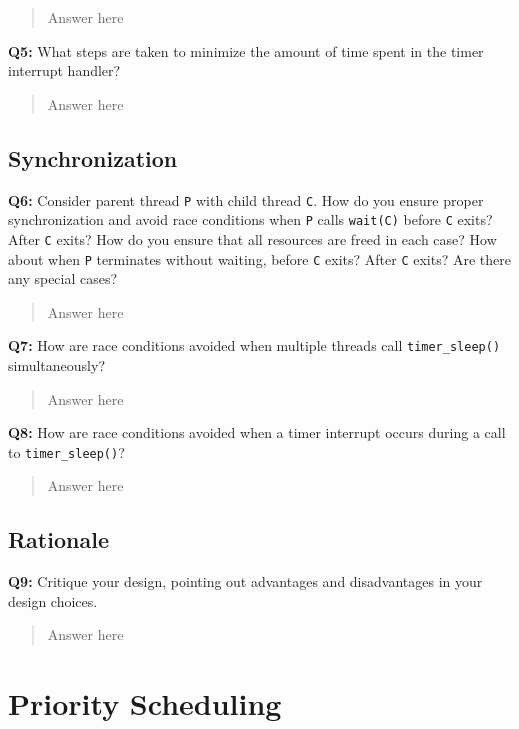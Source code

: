\documentclass[a4paper,11pt]{paper}
\begin{document}
\begin{quote}
  Answer here
\end{quote}

\textbf{Q5:} What steps are taken to minimize the amount of time spent in the
timer interrupt handler?

\begin{quote}
  Answer here
\end{quote}


\subsection{Synchronization}

\textbf{Q6:} Consider parent thread \texttt{P} with child thread \texttt{C}.
How do you ensure proper synchronization and avoid race conditions when
\texttt{P} calls \texttt{wait(C)} before \texttt{C} exits?  After \texttt{C}
exits?  How do you ensure that all resources are freed in each case?  How about
when \texttt{P} terminates without waiting, before \texttt{C} exits?  After
\texttt{C} exits?  Are there any special cases?

\begin{quote}
  Answer here
\end{quote}

\textbf{Q7:} How are race conditions avoided when multiple threads call
\texttt{timer\_sleep()} simultaneously?

\begin{quote}
  Answer here
\end{quote}

\textbf{Q8:} How are race conditions avoided when a timer interrupt occurs
during a call to \texttt{timer\_sleep()}?

\begin{quote}
  Answer here
\end{quote}


\subsection{Rationale}

\textbf{Q9:} Critique your design, pointing out advantages and disadvantages in
your design choices.

\begin{quote}
  Answer here
\end{quote}




\section{Priority Scheduling}
\end{document}
